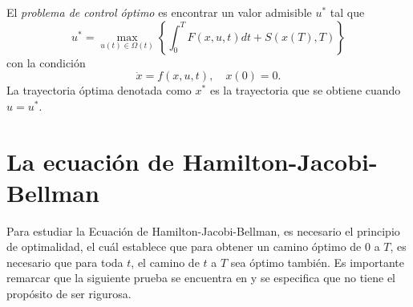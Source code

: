 \begin{definition}
    El \textsl{problema de control óptimo} es encontrar un valor admisible $u^*$ tal que 
    \begin{equation}
        \label{ch2umax}
        u^* = \max_{u(t)\in \Omega(t)}\left\{\int_0^T F(x, u, t)dt + S(x(T), T)\right\}
    \end{equation}
    con la condición 
    \begin{equation}
        \label{ch2dynamicCondition}
        \dot x = f(x,u,t), \quad x(0) = 0.
    \end{equation}
    La trayectoria óptima denotada como $x^*$ es la trayectoria que se obtiene cuando $u = u^*$.
\end{definition}

\section{La ecuación de Hamilton-Jacobi-Bellman}
Para estudiar la Ecuación de Hamilton-Jacobi-Bellman, es necesario el principio de optimalidad, el cuál establece que para obtener un camino óptimo de 0 a $T$, es necesario que para toda $t$, el camino de $t$ a $T$ sea óptimo también. Es importante remarcar que la siguiente prueba se encuentra en \cite{suresh} y se especifica que no tiene el propósito de ser rigurosa.

